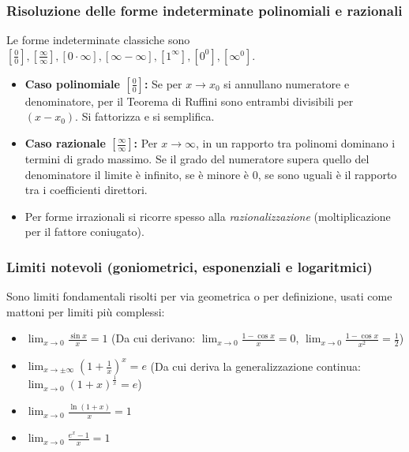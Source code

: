 \subsubsection{Risoluzione delle forme indeterminate polinomiali e razionali}
Le forme indeterminate classiche sono $\left[\frac{0}{0}\right], \left[\frac{\infty}{\infty}\right], [0 \cdot \infty], [\infty - \infty], [1^\infty], [0^0], [\infty^0]$.
\begin{itemize}
    \item \textbf{Caso polinomiale $\left[\frac{0}{0}\right]$:} Se per $x \to x_0$ si annullano numeratore e denominatore, per il Teorema di Ruffini sono entrambi divisibili per $(x-x_0)$. Si fattorizza e si semplifica.
    \item \textbf{Caso razionale $\left[\frac{\infty}{\infty}\right]$:} Per $x \to \infty$, in un rapporto tra polinomi dominano i termini di grado massimo. Se il grado del numeratore supera quello del denominatore il limite è infinito, se è minore è $0$, se sono uguali è il rapporto tra i coefficienti direttori.
    \item Per forme irrazionali si ricorre spesso alla \textit{razionalizzazione} (moltiplicazione per il fattore coniugato).
\end{itemize}

\subsubsection{Limiti notevoli (goniometrici, esponenziali e logaritmici)}
Sono limiti fondamentali risolti per via geometrica o per definizione, usati come mattoni per limiti più complessi:
\begin{itemize}
    \item $\lim_{x \to 0} \frac{\sin x}{x} = 1$ \quad (Da cui derivano: $\lim_{x \to 0} \frac{1-\cos x}{x} = 0$, $\lim_{x \to 0} \frac{1-\cos x}{x^2} = \frac{1}{2}$)
    \item $\lim_{x \to \pm\infty} \left(1 + \frac{1}{x}\right)^x = e$ \quad (Da cui deriva la generalizzazione continua: $\lim_{x \to 0} (1+x)^{\frac{1}{x}} = e$)
    \item $\lim_{x \to 0} \frac{\ln(1+x)}{x} = 1$
    \item $\lim_{x \to 0} \frac{e^x - 1}{x} = 1$
\end{itemize}

